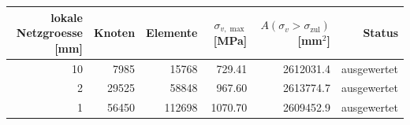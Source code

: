 \begin{tabular}{rrrrrr}
\toprule
lokale Netzgroesse [mm] & Knoten & Elemente & $\sigma_{v,\max}$ [MPa] & $A(\sigma_v>\sigma_\mathrm{zul})$ [mm$^2$] & Status\\
\midrule
10 & 7985 & 15768 & 729.41 & 2612031.4 & ausgewertet\\
2 & 29525 & 58848 & 967.60 & 2613774.7 & ausgewertet\\
1 & 56450 & 112698 & 1070.70 & 2609452.9 & ausgewertet\\
\bottomrule
\end{tabular}
